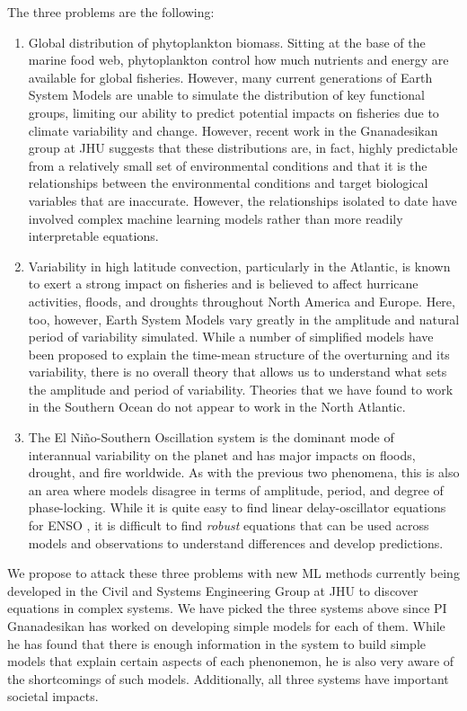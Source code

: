 \documentclass{article}
\begin{document}
The three problems are the following:
\begin{enumerate}[leftmargin=*]
    \item 
    Global distribution of phytoplankton biomass. Sitting at the base of the marine food web, phytoplankton control how much nutrients and energy are available for global fisheries. However, many current generations of Earth System Models are unable to simulate the distribution of key functional groups, limiting our ability to predict potential impacts on fisheries due to climate variability and change. However, recent work in the Gnanadesikan group at JHU \citep{dutta2025using,gnanadesikan2025machine,holder2023well,jin2024using} suggests that these distributions are, in fact, highly predictable from a relatively small set of environmental conditions and that it is the relationships between the environmental conditions and target biological variables that are inaccurate. However, the relationships isolated to date have involved complex machine learning models rather than more readily interpretable equations. 
    \item 
    Variability in high latitude convection, particularly in the Atlantic, is known to exert a strong impact on fisheries and is believed to affect hurricane activities, floods, and droughts throughout North America and Europe. Here, too, however, Earth System Models vary greatly in the amplitude and natural period of variability simulated. While a number of simplified models have been proposed to explain the time-mean structure of the overturning and its variability, there is no overall theory that allows us to understand what sets the amplitude and period of variability. Theories that we have found to work in the Southern Ocean \citep{gnanadesikan2020feedbacks} do not appear to work in the North Atlantic.
    \item The El Ni\~no-Southern Oscillation system is the dominant mode of interannual variability on the planet and has major impacts on floods, drought, and fire worldwide. As with the previous two phenomena, this is also an area where models disagree in terms of amplitude, period, and degree of phase-locking. While it is quite easy to find linear delay-oscillator equations for ENSO \citep{russell2014understanding,vanOldenburgh2005searching}, it is difficult to find {\it robust} equations that can be used across models and observations to understand differences and develop predictions. 
\end{enumerate}

We propose to attack these three problems with new ML methods currently being developed in the Civil and Systems Engineering Group at JHU to discover equations in complex systems. We have picked the three systems above since PI Gnanadesikan has worked on developing simple models for each of them. While he has found that there is enough information in the system to build simple models that explain certain aspects of each phenonemon, he is also very aware of the shortcomings of such models. Additionally, all three systems have important societal impacts.
\end{document}
